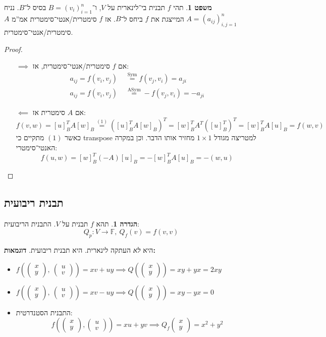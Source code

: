 \documentclass[a4paper]{article}
\DeclareMathOperator{\sym}     {Sym}
\DeclareMathOperator{\asym}    {ASym}
\newcommand\F         {\mathbb{F}}
\newcommand\co        {\colon}
\newcommand\pms[1]    {\begin{pmatrix}
		#1
\end{pmatrix}}
\newcommand\cl [1]    {\left ( #1 \right )}
\theoremstyle{definition}
\newtheorem{Theorem}{\color{myblue}משפט}
\newtheorem{Definition}{\color{mygreen}הגדרה}
\newcommand\theo  [1] {\begin{Theorem}#1\end{Theorem}}
\newcommand\defi  [1] {\begin{Definition}#1\end{Definition}}
\begin{document}
	\theo{תהי $f$ תבנית בי־לינארית על $V$, ו־$B = (v_i)_{i = 1}^{n}$ בסיס ל־$B$. נניח $A =(a_{ij})^{n}_{i, j = 1}$ המייצגת את $f$ ביחס ל־$B$. אז $f$ סימטרית/אנטי־סימטרית אמ''מ $A$ סימטרית/אנטי־סימטרית. }
	
	\begin{proof}\,
		\begin{itemize}
			\item[$\implies$] אם $f$ סימטרית/אנטי־סימטרית, אז: 
			\begin{align*}
				a_{ij} = f(v_i, v_j) &\overset{\sym}{=} f(v_j, v_i) = a_{ji} \\
				a_{ij} = f(v_i, v_j) \,\,&\!\!\overset{\asym}{=} -f(v_j, v_i) = -a_{ji}
			\end{align*}
			\item[$\impliedby$] אם $A$ סימטרית אז: 
			\[ f(v, w) = [u]_B^TA[w]_B \overset{(1)}{=} ([u]_B^TA[w]_B)^T = [w]_B^TA^T([u]_B^T)^T = [w]^T_BA[u]_B = f(w, v) \]
			כאשר $(1)$ מתקיים כי transpose למטריצה מגודל $1 \times 1$ מחזיר אותו הדבר. וכן במקרה האנטי־סימטרי: 
			\[ f(u, w) = [w]^T_B(-A)[u]_B = -[w]_B^TA[u]_B = -(w, u) \]
		\end{itemize}
	\end{proof}
	
	\subsection{תבנית ריבועית}
	\defi{תהא $f$ תבנית על $V$. התבנית הריבועית: 
		\[ Q_p \co V \to \F, \ Q_f(v) = f(v, v) \]}
	היא \textit{לא} העתקה לינארית. היא תבנית ריבועית. \textbf{דוגמאות: }
	\begin{itemize}
		\item \hfil $\displaystyle f\cl{\pms{x \\ y}, \ \pms{u \\ v}} = xv + uy \implies Q\cl{\pms{x \\ y}} = xy + yx = 2xy$
		\item \hfil $\displaystyle f\cl{\pms{x \\ y}, \ \pms{u \\ v}} = xv - uy \implies Q\cl{\pms{x \\ y}} = xy - yx = 0$
		\item התבנית הסטנדרטית: 
		\[ f\cl{\pms{x \\ y}, \pms{u \\ v}} = xu + yv \implies Q_f\pms{x \\ y} = x^2 + y^2 \]
	\end{itemize}
	
\end{document}
